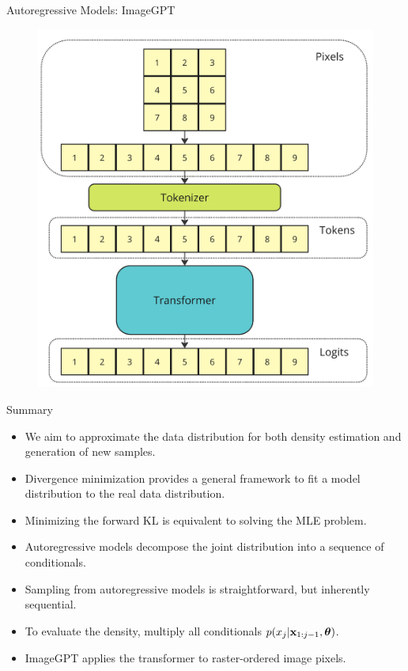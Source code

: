 \documentclass{beamer}
\begin{document}
\begin{frame}{Autoregressive Models: ImageGPT}
	\begin{figure}
		\centering
  			\includegraphics[width=0.65\linewidth]{figs/imagegpt.png}
	\end{figure}
\end{frame}
\begin{frame}{Summary}
    \begin{itemize}
    	\item We aim to approximate the data distribution for both density estimation and generation of new samples.
    	\vfill
    	\item Divergence minimization provides a general framework to fit a model distribution to the real data distribution.
    	\vfill
    	\item Minimizing the forward KL is equivalent to solving the MLE problem.
    	\vfill
    	\item Autoregressive models decompose the joint distribution into a sequence of conditionals.
    	 \vfill
        \item Sampling from autoregressive models is straightforward, but inherently sequential.
        \vfill
        \item To evaluate the density, multiply all conditionals $p(x_j | \mathbf{x}_{1:j - 1}, \boldsymbol{\theta})$.
        \vfill
     	\item ImageGPT applies the transformer to raster-ordered image pixels.
    \end{itemize}
\end{frame}
\end{document}
